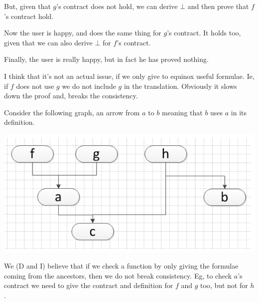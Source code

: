 \documentclass{article}
\begin{document}
But, given that $g$'s contract does not hold, we can derive $\bot$ and
then prove that $f$'s contract hold.

Now the user is happy, and does the same thing for $g$'s contract. It
holds too, given that we can also derive $\bot$ for $f$'s contract.

Finally, the user is really happy, but in fact he has proved nothing.


I think that it's not an actual issue, if we only give to equinox
useful formulae. Ie, if $f$ does not use $g$ we do not include $g$ in
the translation. Obviously it slows down the proof and, breaks the
consistency.

Consider the following graph, an arrow from $a$ to $b$ meaning that
$b$ uses $a$ in its definition.

\begin{center}
\includegraphics[scale=0.5]{flow.png}
\end{center}

We (D and I) believe that if we check a function by only giving the
formulae coming from the ancestors, then we do not break consistency.
Eg, to check $a$'s contract we need to give the contract and
definition for $f$ and $g$ too, but not for $h$.
\end{document}
